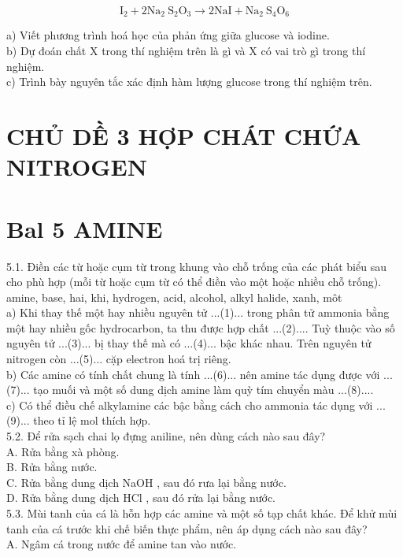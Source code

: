 \documentclass[10pt]{article}
\begin{document}
$$
\mathrm{I}_{2}+2 \mathrm{Na}_{2} \mathrm{~S}_{2} \mathrm{O}_{3} \rightarrow 2 \mathrm{NaI}+\mathrm{Na}_{2} \mathrm{~S}_{4} \mathrm{O}_{6}
$$

a) Viết phương trình hoá học của phản ứng giữa glucose và iodine.\\
b) Dự đoán chất X trong thí nghiệm trên là gì và X có vai trò gì trong thí nghiệm.\\
c) Trình bày nguyên tắc xác định hàm lượng glucose trong thí nghiệm trên.

\section*{CHỦ DỀ 3 HỢP CHÁT CHỨA NITROGEN}
\section*{Bal 5 AMINE}
5.1. Điền các từ hoặc cụm từ trong khung vào chỗ trống của các phát biểu sau cho phù hợp (mỗi từ hoặc cụm từ có thể điền vào một hoặc nhiều chỗ trống).\\
amine, base, hai, khi, hydrogen, acid, alcohol, alkyl halide, xanh, môt\\
a) Khi thay thế một hay nhiều nguyên tử ...(1)... trong phân tử ammonia bằng một hay nhiều gốc hydrocarbon, ta thu được hợp chất ...(2).... Tuỳ thuộc vào số nguyên tử ...(3)... bị thay thế mà có ...(4)... bậc khác nhau. Trên nguyên tử nitrogen còn ...(5)... cặp electron hoá trị riêng.\\
b) Các amine có tính chất chung là tính ...(6)... nên amine tác dụng được với ...(7)... tạo muối và một số dung dịch amine làm quỳ tím chuyển màu ...(8)....\\
c) Có thể điều chế alkylamine các bậc bằng cách cho ammonia tác dụng với ...(9)... theo tỉ lệ mol thích hợp.\\
5.2. Để rửa sạch chai lọ đựng aniline, nên dùng cách nào sau đây?\\
A. Rửa bằng xà phòng.\\
B. Rửa bằng nước.\\
C. Rửa bằng dung dịch NaOH , sau đó rưa lại bằng nước.\\
D. Rửa bằng dung dịch HCl , sau đó rửa lại bằng nước.\\
5.3. Mùi tanh của cá là hỗn hợp các amine và một số tạp chất khác. Để khử mùi tanh của cá trước khi chế biến thực phẩm, nên áp dụng cách nào sau đây?\\
A. Ngâm cá trong nước để amine tan vào nước.\\
\end{document}
